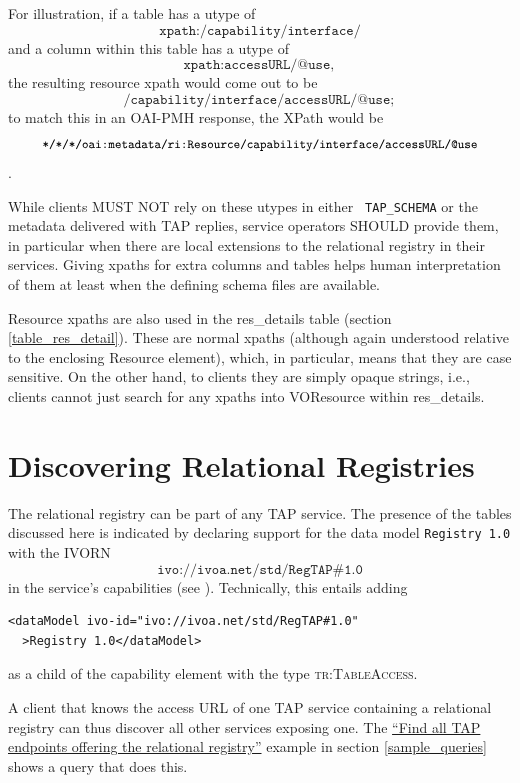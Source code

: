 \documentclass[11pt,a4paper]{ivoa}
\newcommand{\tapent}[1]{\texttt{\color{tapcolor} #1}}
\newcommand{\vorent}[1]{\textsc{#1}}
\begin{document}
For illustration, if a table has a utype of
$$\texttt{xpath:/capability/interface/}$$ and a column within this table
has a utype of $$\texttt{xpath:accessURL/@use},$$ the resulting resource
xpath would come out to be
$$\texttt{/capability/interface/accessURL/@use};$$ to match this in an
OAI-PMH response, the XPath would be
$$\texttt{\small */*/*/oai:metadata/ri:Resource/capability/interface/accessURL/@use}$$.


While clients MUST NOT rely on these utypes in either
\tapent{TAP\_SCHEMA} or the
metadata delivered with TAP replies, service operators SHOULD provide them, in
particular when there are local extensions to the relational registry in their
services.  Giving xpaths for extra columns and tables helps human
interpretation of them at least when the defining schema files are
available.

Resource xpaths are also used in the res\_details table (section
\ref{table_res_detail}).  These are normal xpaths
(although again understood relative to the enclosing Resource element),
which, in particular, means that they are case sensitive.  On the other
hand, to clients they are simply opaque strings, i.e., clients cannot
just search for any xpaths into VOResource within res\_details.




\section{Discovering Relational Registries}

\label{registration}

The relational registry can be part of any TAP service.  The presence
of the tables discussed here is indicated by declaring support for the
data model \texttt{Registry 1.0} with the IVORN
$$\texttt{ivo://ivoa.net/std/RegTAP\#1.0}$$ in the service's
capabilities (see \citep{std:TAPREGEXT}).  Technically, this
entails adding


\begin{verbatim}
<dataModel ivo-id="ivo://ivoa.net/std/RegTAP#1.0"
  >Registry 1.0</dataModel>
\end{verbatim}

as a child of the capability element with the type
\vorent{tr:TableAccess}.

A client that knows the access URL of one TAP service containing 
a relational
registry can thus discover all other services exposing one. The \href{#example-findregtap}{``Find all TAP endpoints offering the
relational registry''} example in section
\ref{sample_queries} shows a query that does
this.
\end{document}
